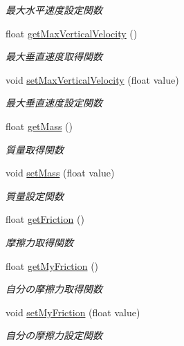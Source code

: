\begin{DoxyCompactItemize}
\begin{DoxyCompactList}\small\item\em 最大水平速度設定関数 \end{DoxyCompactList}\item 
float \mbox{\hyperlink{class_physics_a80d556fa40945e73ca6d4d6931b743ad}{get\+Max\+Vertical\+Velocity}} ()
\begin{DoxyCompactList}\small\item\em 最大垂直速度取得関数 \end{DoxyCompactList}\item 
void \mbox{\hyperlink{class_physics_a6a96fd4d918235e89384320519eae0f5}{set\+Max\+Vertical\+Velocity}} (float value)
\begin{DoxyCompactList}\small\item\em 最大垂直速度設定関数 \end{DoxyCompactList}\item 
float \mbox{\hyperlink{class_physics_a4ce827465a471657b4f4e8973e9f2138}{get\+Mass}} ()
\begin{DoxyCompactList}\small\item\em 質量取得関数 \end{DoxyCompactList}\item 
void \mbox{\hyperlink{class_physics_ab852c1bb08fcd4f364c2650cadfe1eda}{set\+Mass}} (float value)
\begin{DoxyCompactList}\small\item\em 質量設定関数 \end{DoxyCompactList}\item 
float \mbox{\hyperlink{class_physics_ad85a3df693d588f8ff528566c5218533}{get\+Friction}} ()
\begin{DoxyCompactList}\small\item\em 摩擦力取得関数 \end{DoxyCompactList}\item 
float \mbox{\hyperlink{class_physics_a293e9ef38e53b79692c4a9d4a60b13ed}{get\+My\+Friction}} ()
\begin{DoxyCompactList}\small\item\em 自分の摩擦力取得関数 \end{DoxyCompactList}\item 
void \mbox{\hyperlink{class_physics_a848d75133a2c2f46a73c8439f29297c5}{set\+My\+Friction}} (float value)
\begin{DoxyCompactList}\small\item\em 自分の摩擦力設定関数 \end{DoxyCompactList}\item 

\end{DoxyCompactItemize}
